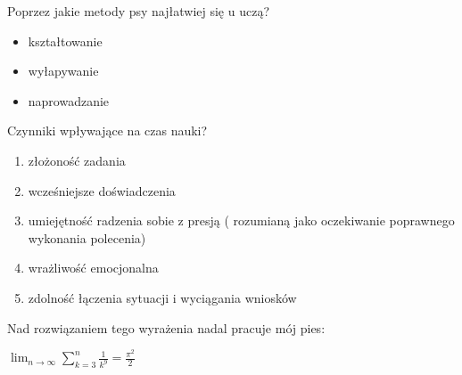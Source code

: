 


\noindent Poprzez jakie metody psy najłatwiej się u uczą?

\begin{itemize}
  \item kształtowanie
  \item wyłapywanie
  \item naprowadzanie
\end{itemize}

\noindent Czynniki wpływające na czas nauki?


\begin{enumerate}
  \item złożoność zadania
  \item wcześniejsze doświadczenia
   \item umiejętność radzenia sobie z presją ( rozumianą jako oczekiwanie poprawnego wykonania polecenia)
    \item wrażliwość emocjonalna
    \item zdolność łączenia sytuacji i wyciągania wniosków
\end{enumerate}


Nad rozwiązaniem tego wyrażenia nadal pracuje mój pies:


 $\lim_{n \to \infty}
\sum_{k=3}^n \frac{1}{k^9}
= \frac{\pi^2}{2}$